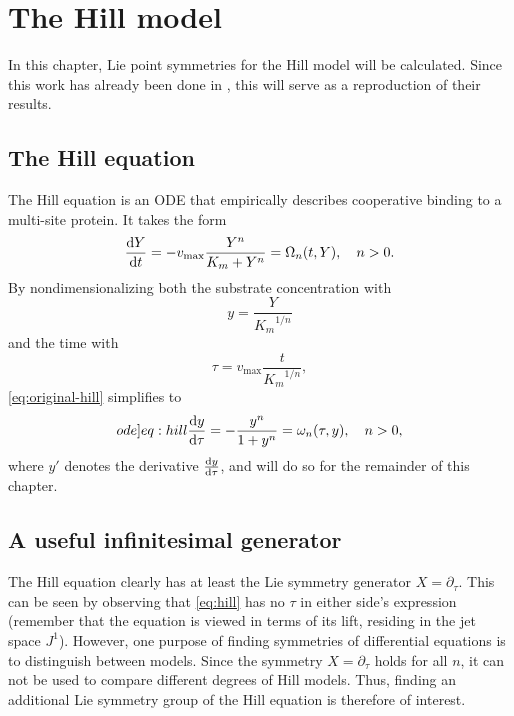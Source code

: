 \chapter{The Hill model}

In this chapter, Lie point symmetries for the Hill model will be calculated.
Since this work has already been done in \cite{ohlsson2020symmetry}, this will serve as a reproduction of their results.

\section{The Hill equation}

The Hill equation is an ODE that empirically describes cooperative binding to a multi-site protein.
It takes the form
\begin{equation} \label{eq:original-hill}
  \dv{Y}{t} = - v_\text{max} \frac{Y^n}{K_m + Y^n} = \Omega_n(t, Y), \quad
  n > 0.
\end{equation}
By nondimensionalizing both the substrate concentration with
\begin{equation}
  y = \frac{Y}{{K_m}^{1/n}}
\end{equation}
and the time with
\begin{equation}
  \tau = v_\text{max} \frac{t}{{K_m}^{1/n}},
\end{equation}
\cref{eq:original-hill} simplifies to
\begin{equation} \label[ode]{eq:hill}
  \dv{y}{\tau} = - \frac{y^n}{1 + y^n} = \omega_n(\tau, y), \quad
  n > 0,
\end{equation}
where \(y'\) denotes the derivative \(\dv{y}{\tau}\), and will do so for the remainder of this chapter.

\section{A useful infinitesimal generator}

The Hill equation clearly has at least the Lie symmetry generator \(X=\partial_\tau\).
This can be seen by observing that \cref{eq:hill} has no \(\tau\) in either side's expression (remember that the equation is viewed in terms of its lift, residing in the jet space \(J^1\)).
However, one purpose of finding symmetries of differential equations is to distinguish between models.
Since the symmetry \(X=\partial_\tau\) holds for all \(n\), it can not be used to compare different degrees of Hill models.
Thus, finding an additional Lie symmetry group of the Hill equation is therefore of interest.

